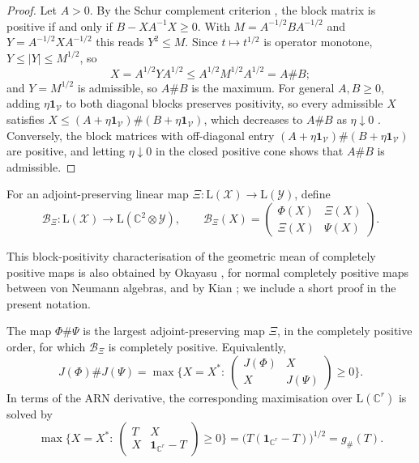 \begin{proof}
Let $A>0$. By the Schur complement criterion \cite[Chapter~1]{Bhatia2007positive}, the block matrix is positive if and only if $B-XA^{-1}X\geq0$. With $M=A^{-1/2}BA^{-1/2}$ and $Y=A^{-1/2}XA^{-1/2}$ this reads $Y^2\leq M$. Since $t\mapsto t^{1/2}$ is operator monotone, $Y\leq|Y|\leq M^{1/2}$, so
\[
X=A^{1/2}YA^{1/2}\leq A^{1/2}M^{1/2}A^{1/2}=A\#B;
\]
and $Y=M^{1/2}$ is admissible, so $A\#B$ is the maximum. For general $A,B\geq0$, adding $\eta\mathbf{1}_{\mathcal{V}}$ to both diagonal blocks preserves positivity, so every admissible $X$ satisfies $X\leq(A+\eta\mathbf{1}_{\mathcal{V}})\#(B+\eta\mathbf{1}_{\mathcal{V}})$, which decreases to $A\#B$ as $\eta\downarrow0$ \cite{KuboAndo1980}. Conversely, the block matrices with off-diagonal entry $(A+\eta\mathbf{1}_{\mathcal{V}})\#(B+\eta\mathbf{1}_{\mathcal{V}})$ are positive, and letting $\eta\downarrow0$ in the closed positive cone shows that $A\#B$ is admissible.
\end{proof}
 
For an adjoint-preserving linear map $\Xi:\mathrm{L}(\mathcal{X})\to\mathrm{L}(\mathcal{Y})$, define
\[
\mathcal{B}_\Xi:\mathrm{L}(\mathcal{X})\to\mathrm{L}(\mathbb{C}^2\otimes\mathcal{Y}),\qquad
\mathcal{B}_\Xi(X)=\begin{pmatrix}\Phi(X)&\Xi(X)\\\Xi(X)&\Psi(X)\end{pmatrix}.
\]
 
This block-positivity characterisation of the geometric mean of completely positive maps is also obtained by Okayasu \cite{Okayasu2026}, for normal completely positive maps between von Neumann algebras, and by Kian \cite{kian2026relative}; we include a short proof in the present notation.

\begin{proposition}\label{cont:app:variational}
The map $\Phi\#\Psi$ is the largest adjoint-preserving map $\Xi$, in the completely positive order, for which $\mathcal{B}_\Xi$ is completely positive. Equivalently,
\[
J(\Phi)\#J(\Psi)=\max\Big\{X=X^*:\ \begin{pmatrix}J(\Phi)&X\\X&J(\Psi)\end{pmatrix}\geq0\Big\}.
\]
In terms of the ARN derivative, the corresponding maximisation over $\mathrm{L}(\mathbb{C}^r)$ is solved by
\[
\max\Big\{X=X^*:\ \begin{pmatrix}T&X\\X&\mathbf{1}_{\mathbb{C}^r}-T\end{pmatrix}\geq0\Big\}=\big(T(\mathbf{1}_{\mathbb{C}^r}-T)\big)^{1/2}=g_\#(T).
\]
\end{proposition}
 
